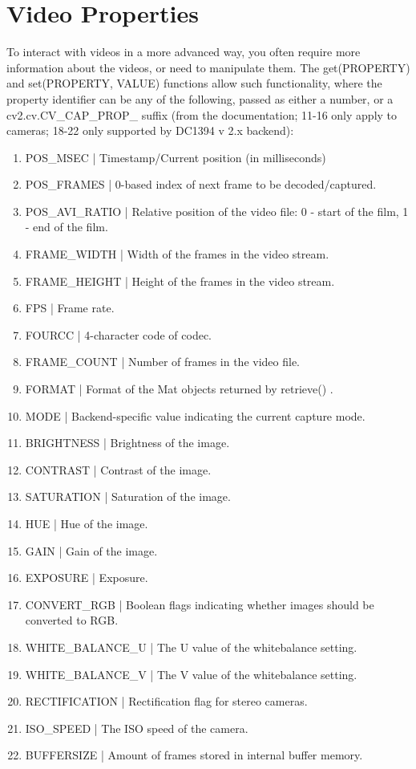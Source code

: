 \documentclass[a4paper,12pt]{article}
\begin{document}
\section{Video Properties}
To interact with videos in a more advanced way, you often require more information about the videos, or need to manipulate them. The get(PROPERTY) and set(PROPERTY, VALUE) functions allow such functionality, where the property identifier can be any of the following, passed as either a number, or a cv2.cv.CV\_CAP\_PROP\_ suffix (from the documentation; 11-16 only apply to cameras; 18-22 only supported by DC1394 v 2.x backend):
\footnotesize{
\begin{enumerate}
\itemsep0em
\setcounter{enumi}{-1}
\item POS\_MSEC | Timestamp/Current position (in milliseconds)
\item POS\_FRAMES | 0-based index of next frame to be decoded/captured.
\item POS\_AVI\_RATIO | Relative position of the video file: 0 - start of the film, 1 - end of the film.
\item FRAME\_WIDTH | Width of the frames in the video stream.
\item FRAME\_HEIGHT | Height of the frames in the video stream.
\item FPS | Frame rate.
\item FOURCC | 4-character code of codec.
\item FRAME\_COUNT | Number of frames in the video file.
\item FORMAT | Format of the Mat objects returned by retrieve() .
\item MODE | Backend-specific value indicating the current capture mode.
\item BRIGHTNESS | Brightness of the image.
\item CONTRAST | Contrast of the image.
\item SATURATION | Saturation of the image.
\item HUE | Hue of the image.
\item GAIN | Gain of the image.
\item EXPOSURE | Exposure.
\item CONVERT\_RGB | Boolean flags indicating whether images should be converted to RGB.
\item WHITE\_BALANCE\_U | The U value of the whitebalance setting.
\item WHITE\_BALANCE\_V | The V value of the whitebalance setting.
\item RECTIFICATION | Rectification flag for stereo cameras.
\item ISO\_SPEED | The ISO speed of the camera.
\item BUFFERSIZE | Amount of frames stored in internal buffer memory.
\end{enumerate}
}
\end{document}
